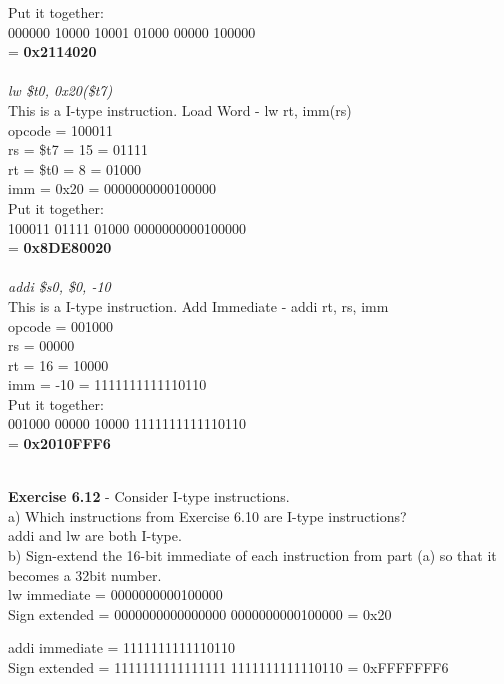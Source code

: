 \documentclass[12pt,a4paper]{report}
\begin{document}
\begin{normalsize}
Put it together: \\
000000 10000 10001 01000 00000 100000 \\
= \textbf{0x2114020} \\ \\

\textit{lw \$t0, 0x20(\$t7)} \\
This is a I-type instruction. Load Word - lw rt, imm(rs) \\

opcode = 100011 \\
rs = \$t7 = 15 = 01111 \\
rt = \$t0 = 8 = 01000 \\
imm = 0x20 = 0000000000100000 \\

Put it together: \\
100011 01111 01000 0000000000100000 \\
= \textbf{0x8DE80020} \\ \\

\textit{addi \$s0, \$0, -10} \\
This is a I-type instruction. Add Immediate - addi rt, rs, imm \\

opcode = 001000 \\
rs = 00000 \\
rt = 16 = 10000 \\
imm = -10 = 1111111111110110 \\

Put it together: \\
001000 00000 10000 1111111111110110 \\
= \textbf{0x2010FFF6} \\ \\

\medskip

\textbf{Exercise 6.12} - Consider I-type instructions. \\
a) Which instructions from Exercise 6.10 are I-type instructions? \\
addi and lw are both I-type. \\

b) Sign-extend the 16-bit immediate of each instruction from part (a) so that it becomes a 32bit number. \\
lw immediate = 0000000000100000 \\
Sign extended = 0000000000000000 0000000000100000 = 0x20

addi immediate = 1111111111110110 \\
Sign extended = 1111111111111111 1111111111110110 = 0xFFFFFFF6




\end{normalsize}
\end{document}

